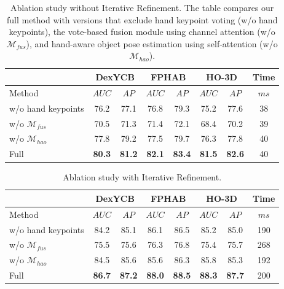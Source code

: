 \begin{table}[h]
\caption{Ablation study without Iterative Refinement. The table compares our full method with versions that exclude hand keypoint voting (w/o hand keypoints), the vote-based fusion module using channel attention (w/o $\mathcal{M}_{fus}$), and hand-aware object pose estimation using self-attention (w/o $\mathcal{M}_{hao}$).}
\label{tab:ablation_without_ir}
\begin{center}
\begin{tabular}{|l|c|c|c|c|c|c|c|} 
\hline
& \multicolumn{2}{c|}{DexYCB} & \multicolumn{2}{c|}{FPHAB} & \multicolumn{2}{c|}{HO-3D} & Time \\
\hline
Method & $AUC$ & $AP$ & $AUC$ & $AP$ & $AUC$ & $AP$ & $ms$ \\  
\hline 
w/o hand keypoints & 76.2 & 77.1 & 76.8 & 79.3 & 75.2 & 77.6 & 38 \\

w/o $\mathcal{M}_{fus}$ & 70.5 & 71.3 & 71.4 & 72.1 & 68.4 & 70.2 & 39 \\

w/o $\mathcal{M}_{hao}$ & 77.8 & 79.2 & 77.5 & 79.7 & 76.3 & 77.8 & 40 \\

Full & \textbf{80.3} & \textbf{81.2} & \textbf{82.1} & \textbf{83.4} & \textbf{81.5} & \textbf{82.6} & 40 \\
\hline
\end{tabular}
\end{center}
\end{table}

\begin{table}[h]
\caption{Ablation study with Iterative Refinement.}
\label{tab:ablation_with_ir}
\begin{center}
\begin{tabular}{|l|c|c|c|c|c|c|c|} 
\hline
& \multicolumn{2}{c|}{DexYCB} & \multicolumn{2}{c|}{FPHAB} & \multicolumn{2}{c|}{HO-3D} & Time \\
\hline
Method & $AUC$ & $AP$ & $AUC$ & $AP$ & $AUC$ & $AP$ & $ms$ \\  
\hline 
w/o hand keypoints & 84.2 & 85.1 & 86.1 & 86.5 & 85.2 & 85.0 & 190 \\

w/o $\mathcal{M}_{fus}$ & 75.5 & 75.6 & 76.3 & 76.8 & 75.4 & 75.7 & 268 \\

w/o $\mathcal{M}_{hao}$ & 84.5 & 85.6 & 85.6 & 86.3 & 85.8 & 85.3 & 192 \\

Full & \textbf{86.7} & \textbf{87.2} & \textbf{88.0} & \textbf{88.5} & \textbf{88.3} & \textbf{87.7} & 200 \\
\hline
\end{tabular}
\end{center}
\end{table}

